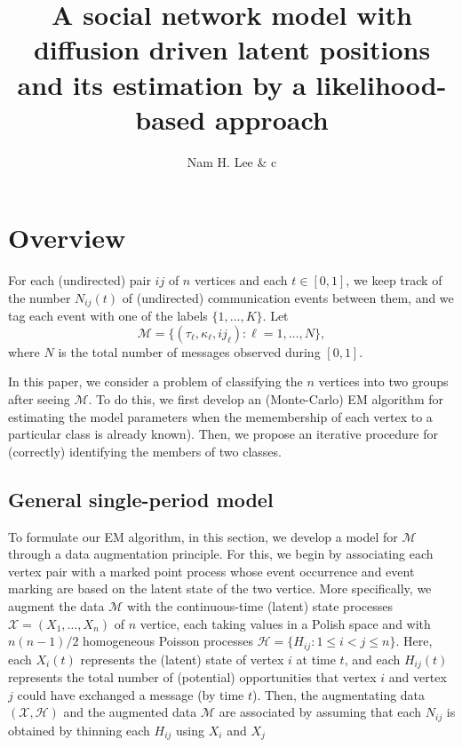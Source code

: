 \documentclass[12pt]{article}%
\title{A social network model with diffusion driven latent positions and its estimation by a likelihood-based approach}
\author{Nam H. Lee \& c}
\begin{document}
\maketitle

\section{Overview}
For each (undirected) pair $ij$ of $n$ vertices and each $t \in [0,1]$,
we keep track of the number $N_{ij}(t)$ of (undirected) communication events between them, 
and we tag each event with one of the labels $\{1,\ldots, K\}$. Let
$$
\mathcal M = \{ (\tau_\ell, \kappa_\ell, ij_{\ell}) : \ell=1,\ldots, N \},
$$ 
where $N$ is the total number of messages observed during $[0,1]$.  

In this paper, we consider a problem of classifying the $n$ vertices into two groups after seeing $\mathcal M$.  To do this, we first develop an (Monte-Carlo) EM algorithm for estimating the model parameters when the memembership of each vertex to a particular class is already known).  Then, we propose an iterative procedure for (correctly) identifying the members of two classes.   

\subsection{General single-period model}
To formulate our EM algorithm, in this section, 
we develop a model for $\mathcal M$ through a data augmentation principle.
For this, we begin by associating each vertex pair with a marked point process whose 
event occurrence and event marking are based on the latent state of the two vertice. 
More specifically, we augment the data $\mathcal M$ with 
the continuous-time (latent) state processes $\mathcal X = (X_1,\ldots, X_n)$ of $n$ vertice,
each taking values in a Polish space and with $n(n-1)/2$ homogeneous Poisson processes 
$\mathcal H= \{H_{ij} : 1 \le i < j \le n\}$.  
Here, each $X_i(t)$ represents the (latent) state of vertex $i$ at time $t$,
and each $H_{ij}(t)$ represents the total number of (potential) opportunities
that vertex $i$ and vertex $j$ could have exchanged a message (by time $t$).  
Then, the augmentating data $(\mathcal X, \mathcal H)$ and 
the augmented data $\mathcal M$ are associated by assuming that 
each $N_{ij}$ is obtained by  thinning each $H_{ij}$ using $X_i$ and $X_j$ 
\end{document}
